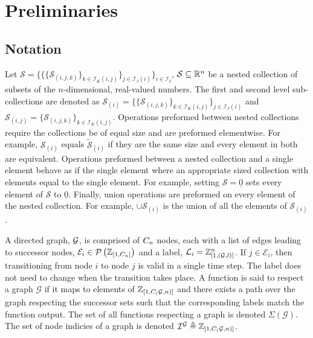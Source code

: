 \section{Preliminaries}
\subsection{Notation}
Let $\mathcal{S}=\{\{\{\mathcal{S}_{(i,j,k)}\}_{k\in\mathcal{I}_{K}(i,j)}\}_{j\in\mathcal{I}_{J}(i)}\}_{i\in\mathcal{I}_I}$, $\mathcal{S}\subseteq\mathbb{R}^n$ be a nested collection of subsets of the $n$-dimensional, real-valued numbers. The first and second level sub-collections are denoted as $\mathcal{S}_{(i)}=\{\{\mathcal{S}_{(i,j,k)}\}_{k\in\mathcal{I}_{K}(i,j)}\}_{j\in\mathcal{I}_{J}(i)}$ and $\mathcal{S}_{(i,j)}=\{\mathcal{S}_{(i,j,k)}\}_{k\in\mathcal{I}_{K}(i,j)}$. Operations preformed between nested collections require the collections be of equal size and are preformed elementwise. For example, $\mathcal{S}_{(i)}$ equals $\tilde{\mathcal{S}}_{(i)}$ if they are the same size and every element in both are equivalent. Operations preformed between a nested collection and a single element behave as if the single element where an appropriate sized collection with elements equal to the single element. For example, setting $\mathcal{S}=\underline{0}$ sets every element of $\mathcal{S}$ to $\underline{0}$. Finally, union operations are preformed on every element of the nested collection. For example, $\cup \mathcal{S}_{(i)}$ is the union of all the elements of $\mathcal{S}_{(i)}$.

A directed graph, $\mathcal{G}$, is comprised of $C_n$ nodes, each with a list of edges leading to successor nodes, $\mathcal{E}_{i}\in\mathcal{P}\left(\mathbb{Z}_{[1,C_n]}\right)$ and a label, $\mathcal{L}_{i}=\mathbb{Z}_{[1,(\mathcal{G},l)]}^n$. If $j\in\mathcal{E}_i$, then transitioning from node $i$ to node $j$ is valid in a single time step. The label does not need to change when the transition takes place. A function is said to respect a graph $\mathcal{G}$ if it maps to elements of $\mathbb{Z}_{[1,C_(\mathcal{G},n)]}$ and there exists a path over the graph respecting the successor sets such that the corresponding labels match the function output. The set of all functions respecting a graph is denoted $\Sigma(\mathcal{G})$. The set of node indicies of a graph is denoted $\mathcal{I}^\mathcal{G}\triangleq\mathbb{Z}_{[1,C_(\mathcal{G},n)]}$.

